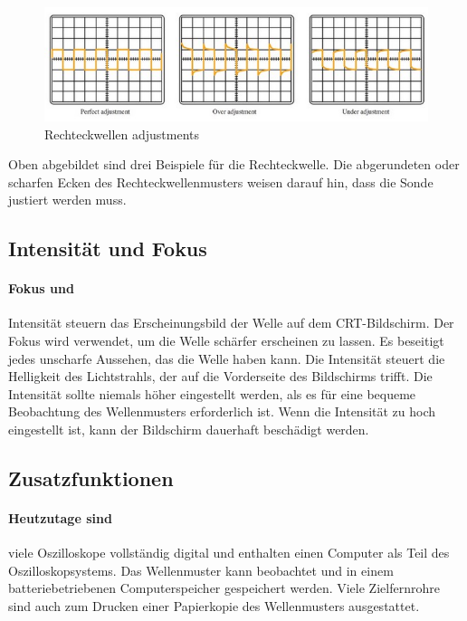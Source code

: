 \documentclass{article}
\begin{document}
\begin{figure}[H]
  \includegraphics[width=\textwidth]{"Rechteckwellen adjustments"}
  \caption[\textbf{Rechteckwellen adjustments.jpg},  Quelle:https://electricalacademia.com/electronics/oscilloscope-work-oscilloscope-parts-functions/ (zuletzt abgerufen: 04.09.2021)]{Rechteckwellen adjustments}
\end{figure}
\newline
 
Oben abgebildet sind drei Beispiele für die Rechteckwelle. Die abgerundeten oder scharfen Ecken des Rechteckwellenmusters weisen darauf hin, dass die Sonde justiert werden muss. \cite{electrivalacademica}

\subsection{Intensität und Fokus}
\paragraph{Fokus und}
Intensität steuern das Erscheinungsbild der Welle auf dem CRT-Bildschirm. Der Fokus wird verwendet, um die Welle schärfer erscheinen zu lassen. Es beseitigt jedes unscharfe Aussehen, das die Welle haben kann. 
Die Intensität steuert die Helligkeit des Lichtstrahls, der auf die Vorderseite des Bildschirms trifft. Die Intensität sollte niemals höher eingestellt werden, als es für eine bequeme Beobachtung des Wellenmusters erforderlich ist. Wenn die Intensität zu hoch eingestellt ist, kann der Bildschirm dauerhaft beschädigt werden. \cite{electrivalacademica}

\subsection{Zusatzfunktionen}
\paragraph{Heutzutage sind}
 viele Oszilloskope vollständig digital und enthalten einen Computer als Teil des Oszilloskopsystems. Das Wellenmuster kann beobachtet und in einem batteriebetriebenen Computerspeicher gespeichert werden. Viele Zielfernrohre sind auch zum Drucken einer Papierkopie des Wellenmusters ausgestattet.
\end{document}
